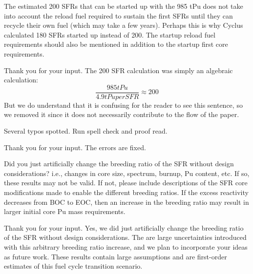 \documentclass[answers,11pt]{exam}
\begin{document}
\begin{questions}
        \question The estimated 200 SFRs that can be started up with the 985 
        tPu does not take into account the reload fuel required to sustain the 
        first SFRs until they can recycle their own fuel (which may take a few 
        years). Perhaps this is why Cyclus calculated 180 SFRs started up 
        instead of 200. The startup reload fuel requirements should also be 
        mentioned in addition to the startup first core requirements.
        \begin{solution}
                Thank you for your input. The 200 SFR calculation was
                simply an algebraic calculation:
                \[ \frac{985 tPu}{4.9 tPu per SFR} \approx 200 \]
                But we do understand that it is confusing for the reader
                to see this sentence, so we removed it since it does not
                necessarily contribute to the flow of the paper.
        \end{solution}

        \question Several typos spotted. Run spell check and proof read.

        \begin{solution}
                Thank you for your input. The errors are fixed.
        \end{solution}

        \question Did you just artificially change the breeding ratio of the 
        SFR without design considerations?  i.e., changes in core size, 
        spectrum, burnup, Pu content, etc. If so, these results may not be 
        valid.  If not, please include descriptions of the SFR core 
        modifications made to enable the different breeding ratios. If the 
        excess reactivity decreases from BOC to EOC, then an increase in the 
        breeding ratio may result in larger initial core Pu mass requirements.
        \begin{solution}
                Thank you for your input. Yes, we did just artificially change
                the breeding ratio of the SFR without design considerations.
                The are large uncertainties introduced with this arbitrary
                breeding ratio increase, and we plan to incorporate your
                ideas as future work. These results contain large assumptions
                and are first-order estimates of this fuel cycle transition
                scenario.
        \end{solution}


\end{questions}
\end{document}
